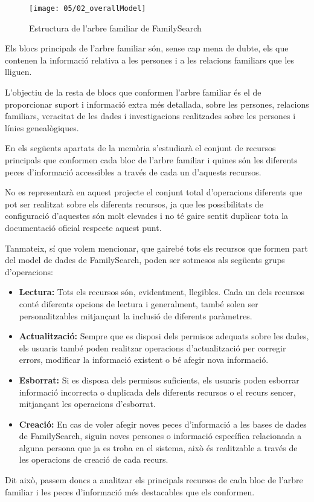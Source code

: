     \begin{figure}[h]
        \texttt{[image: 05/02\_overallModel]}
        \centering
        \caption{Estructura de l'arbre familiar de FamilySearch}\label{fig:familyTree}
    \end{figure}

    Els blocs principals de l'arbre familiar són, sense cap mena de dubte, els que contenen la informació relativa a les persones i a les relacions familiars que les lliguen.

    L’objectiu de la resta de blocs que conformen l'arbre familiar és el de proporcionar suport i informació extra més detallada, sobre les persones, relacions familiars, ve\-ra\-ci\-tat de les dades i investigacions realitzades sobre les persones i línies genealògiques.

    En els següents apartats de la memòria s'estudiarà el conjunt de recursos principals que conformen cada bloc de l'arbre familiar i quines són les diferents peces d'informació accessibles a través de cada un d'aquests recursos.

    No es representarà en aquest projecte el conjunt total d'operacions diferents que pot ser realitzat sobre els diferents recursos, ja que les possibilitats de configuració d'aquestes són molt elevades i no té gaire sentit duplicar tota la documentació oficial respecte aquest punt.

    Tanmateix, sí que volem mencionar, que gairebé tots els recursos que formen part del model de dades de FamilySearch, poden ser sotmesos als següents grups d'operacions:

    \begin{itemize}
        \item \textbf{Lectura:} Tots els recursos són, evidentment, llegibles. Cada un dels recursos conté diferents opcions de lectura i generalment, també solen ser per\-so\-na\-lit\-za\-bles mitjançant la inclusió de diferents paràmetres.
        \item \textbf{Actualització:} Sempre que es disposi dels permisos adequats sobre les dades, els usuaris també poden realitzar operacions d'actualització per corregir errors, modificar la informació existent o bé afegir nova informació.
        \item \textbf{Esborrat:} Si es disposa dels permisos suficients, els usuaris poden esborrar informació incorrecta o duplicada dels diferents recursos o el recurs sencer, mitjançant les operacions d'esborrat.
        \item \textbf{Creació:} En cas de voler afegir noves peces d'informació a les bases de dades de FamilySearch, siguin noves persones o informació específica relacionada a alguna persona que ja es troba en el sistema, això és realitzable a través de les operacions de creació de cada recurs.
    \end{itemize}

    Dit això, passem doncs a analitzar els principals recursos de cada bloc de l'arbre familiar i les peces d'informació més destacables que els conformen.
